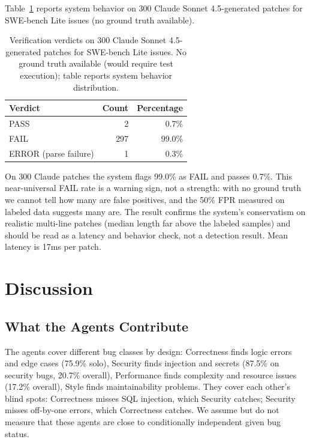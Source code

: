 \documentclass[10pt,twocolumn]{article}
\begin{document}
Table~\ref{tab:claude} reports system behavior on 300 Claude Sonnet 4.5-generated patches for SWE-bench Lite issues (no ground truth available).

\begin{table}[t]
\centering
\caption{Verification verdicts on 300 Claude Sonnet 4.5-generated patches for SWE-bench Lite issues. No ground truth available (would require test execution); table reports system behavior distribution.}
\label{tab:claude}
\small
\begin{tabular}{@{}lrr@{}}
\toprule
\textbf{Verdict} & \textbf{Count} & \textbf{Percentage} \\
\midrule
PASS & 2 & 0.7\% \\
FAIL & 297 & 99.0\% \\
ERROR (parse failure) & 1 & 0.3\% \\
\bottomrule
\end{tabular}
\end{table}

On 300 Claude patches the system flags 99.0\% as FAIL and passes 0.7\%. This near-universal FAIL rate is a warning sign, not a strength: with no ground truth we cannot tell how many are false positives, and the 50\% FPR measured on labeled data suggests many are. The result confirms the system's conservatism on realistic multi-line patches (median length far above the labeled samples) and should be read as a latency and behavior check, not a detection result. Mean latency is 17ms per patch.


\section{Discussion}

\subsection{What the Agents Contribute}

The agents cover different bug classes by design: Correctness finds logic errors and edge cases (75.9\% solo), Security finds injection and secrets (87.5\% on security bugs, 20.7\% overall), Performance finds complexity and resource issues (17.2\% overall), Style finds maintainability problems. They cover each other's blind spots: Correctness misses SQL injection, which Security catches; Security misses off-by-one errors, which Correctness catches. We assume but do not measure that these agents are close to conditionally independent given bug status.
\end{document}
